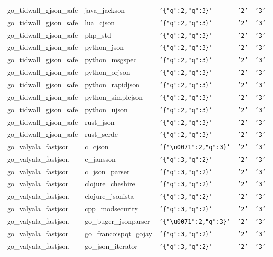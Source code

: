 \documentclass[english, 12pt, a4paper, sci, utf8, a-2b, online]{aaltothesis}
\def\str#1{\texttt{'#1'}}
\begin{document}
\begin{longtable}{lllll}
    go\_tidwall\_gjson\_safe & java\_jackson & \str{\{"q":2,"q":3\}} & \str{2} & \str{3} \\
    go\_tidwall\_gjson\_safe & lua\_cjson & \str{\{"q":2,"q":3\}} & \str{2} & \str{3} \\
    go\_tidwall\_gjson\_safe & php\_std & \str{\{"q":2,"q":3\}} & \str{2} & \str{3} \\
    go\_tidwall\_gjson\_safe & python\_json & \str{\{"q":2,"q":3\}} & \str{2} & \str{3} \\
    go\_tidwall\_gjson\_safe & python\_msgspec & \str{\{"q":2,"q":3\}} & \str{2} & \str{3} \\
    go\_tidwall\_gjson\_safe & python\_orjson & \str{\{"q":2,"q":3\}} & \str{2} & \str{3} \\
    go\_tidwall\_gjson\_safe & python\_rapidjson & \str{\{"q":2,"q":3\}} & \str{2} & \str{3} \\
    go\_tidwall\_gjson\_safe & python\_simplejson & \str{\{"q":2,"q":3\}} & \str{2} & \str{3} \\
    go\_tidwall\_gjson\_safe & python\_ujson & \str{\{"q":2,"q":3\}} & \str{2} & \str{3} \\
    go\_tidwall\_gjson\_safe & rust\_json & \str{\{"q":2,"q":3\}} & \str{2} & \str{3} \\
    go\_tidwall\_gjson\_safe & rust\_serde & \str{\{"q":2,"q":3\}} & \str{2} & \str{3} \\
    go\_valyala\_fastjson & c\_cjson & \str{\{"\textbackslash u0071":2,"q":3\}} & \str{2} & \str{3} \\
    go\_valyala\_fastjson & c\_jansson & \str{\{"q":3,"q":2\}} & \str{2} & \str{3} \\
    go\_valyala\_fastjson & c\_json\_parser & \str{\{"q":3,"q":2\}} & \str{2} & \str{3} \\
    go\_valyala\_fastjson & clojure\_cheshire & \str{\{"q":3,"q":2\}} & \str{2} & \str{3} \\
    go\_valyala\_fastjson & clojure\_jsonista & \str{\{"q":3,"q":2\}} & \str{2} & \str{3} \\
    go\_valyala\_fastjson & cpp\_modsecurity & \str{\{"q":3,"q":2\}} & \str{2} & \str{3} \\
    go\_valyala\_fastjson & go\_buger\_jsonparser & \str{\{"\textbackslash u0071":2,"q":3\}} & \str{2} & \str{3} \\
    go\_valyala\_fastjson & go\_francoispqt\_gojay & \str{\{"q":3,"q":2\}} & \str{2} & \str{3} \\
    go\_valyala\_fastjson & go\_json\_iterator & \str{\{"q":3,"q":2\}} & \str{2} & \str{3} \\

\end{longtable}
\end{document}
